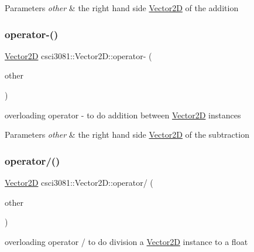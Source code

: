\begin{DoxyParams}{Parameters}
{\em other} & the right hand side \hyperlink{classcsci3081_1_1Vector2D}{Vector2D} of the addition \\
\hline
\end{DoxyParams}
\mbox{\label{classcsci3081_1_1Vector2D_a8ccf17ebee11a2f8f3ce66dd9dec8a13}} 
\subsubsection{\texorpdfstring{operator-\/()}{operator-()}}
{\footnotesize\ttfamily \hyperlink{classcsci3081_1_1Vector2D}{Vector2D} csci3081\+::\+Vector2\+D\+::operator-\/ (\begin{DoxyParamCaption}\item[{const \hyperlink{classcsci3081_1_1Vector2D}{Vector2D} \&}]{other }\end{DoxyParamCaption})}



overloading operator -\/ to do addition between \hyperlink{classcsci3081_1_1Vector2D}{Vector2D} instances 


\begin{DoxyParams}{Parameters}
{\em other} & the right hand side \hyperlink{classcsci3081_1_1Vector2D}{Vector2D} of the subtraction \\
\hline
\end{DoxyParams}
\mbox{\label{classcsci3081_1_1Vector2D_a9e123abdcebfb672cea47d705604a968}} 
\subsubsection{\texorpdfstring{operator/()}{operator/()}}
{\footnotesize\ttfamily \hyperlink{classcsci3081_1_1Vector2D}{Vector2D} csci3081\+::\+Vector2\+D\+::operator/ (\begin{DoxyParamCaption}\item[{float}]{other }\end{DoxyParamCaption})}



overloading operator / to do division a \hyperlink{classcsci3081_1_1Vector2D}{Vector2D} instance to a float 



